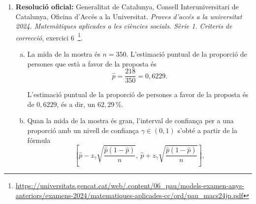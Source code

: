 \begin{enumerate}
\begin{enumerate}[a)]
 Quan la mida de la mostra és gran, l'interval de confiança per a una proporció amb un nivell de confiança $\gamma\in(0,1)$ s'obté a partir de la fórmula  $$\left[\hat{p}-z_{\gamma}\sqrt{\frac{\hat{p}(1-\hat{p})}{n}},\ \hat{p}+z_{\gamma}\sqrt{\frac{\hat{p}(1-\hat{p})}{n}}\right],$$

 en què, si $Z$ segueix una distribució normal $(0,1)$, $P(-z_{\gamma}\leq Z\leq z_{\gamma})=\gamma$. Per tant tenim que els extrems de l'interval són

 $$\hat{p}-z_{\gamma}\sqrt{\frac{\hat{p}(1-\hat{p})}{n}}=0{,}08-1{,}96\sqrt{\frac{0{,}08(1-0{,}08)}{100}}=0{,}0268$$

 i

 $$\hat{p}+z_{\gamma}\sqrt{\frac{\hat{p}(1-\hat{p})}{n}}=0{,}08+1{,}96\sqrt{\frac{0{,}08(1-0{,}08)}{100}}=0{,}1332.$$

 L'interval de confiança demanat és $[0{,}0268;\ 0{,}1332]$. Per tant, amb una confiança del $95\,\%$ sí que podem afirmar que el percentatge ha millorat respecte de l'històric del $15\,\%$. Sabem que, actualment, el percentatge de bicicletes elèctriques que requereixen del servei postvenda està entre el $2{,}6\,\%$ i el $13{,}3\,\%$ amb una confiança del $95\,\%$.
\end{enumerate}
\item \textbf{Resolució oficial:} Generalitat de Catalunya, Consell Interuniversitari de Catalunya, Oficina d'Accés a la Universitat. \textit{Proves d'accés a la universitat 2024. Matemàtiques aplicades a les ciències socials. Sèrie 1. Criteris de correcció}, exercici 6~\footnote{\url{https://universitats.gencat.cat/web/.content/06_pau/models-examen-anys-anteriors/examens-2024/matematiques-aplicades-cc/ord/pau_macs24jp.pdf}}.
\begin{enumerate}[a)]
 \item La mida de la mostra és $n=350$. L'estimació puntual de la proporció de persones que està a favor de la proposta és
 $$\hat{p}=\frac{218}{350}=0{,}6229.$$

 L'estimació puntual de la proporció de persones a favor de la proposta és de $0{,}6229$, és a dir, un $62{,}29\,\%$.

 \item Quan la mida de la mostra és gran, l'interval de confiança per a una proporció amb un nivell de confiança $\gamma\in(0,1)$ s'obté a partir de la fórmula
 $$\left[\hat{p}-z_{\gamma}\sqrt{\frac{\hat{p}(1-\hat{p})}{n}},\ \hat{p}+z_{\gamma}\sqrt{\frac{\hat{p}(1-\hat{p})}{n}}\right],$$


\end{enumerate}
\end{enumerate}
